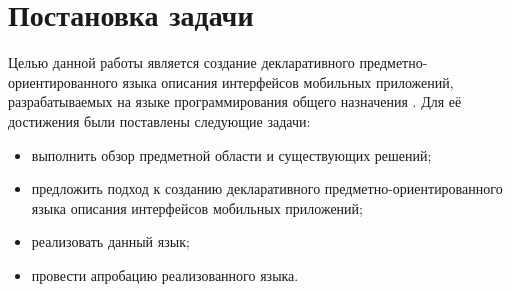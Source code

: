 \section{Постановка задачи}
Целью данной работы является создание декларативного
предметно-ориентированного языка описания интерфейсов мобильных приложений,
разрабатываемых на языке программирования общего назначения .
Для её достижения были поставлены следующие задачи:
\begin{itemize}
	\item выполнить обзор предметной области и существующих решений;
	\item предложить подход к созданию декларативного\newline
	предметно-ориентированного языка описания интерфейсов мобильных
	приложений;
	\item реализовать данный язык;
	\item провести апробацию реализованного языка.
\end{itemize}
